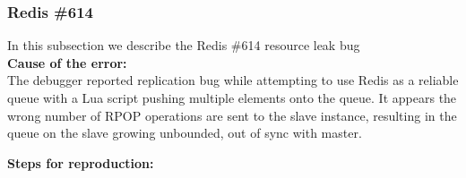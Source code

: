 \subsubsection{Redis \#614}

In this subsection we describe the Redis \#614 resource leak bug \\

\noindent \textbf{Cause of the error:} \\

The debugger reported replication bug while attempting to use Redis as a reliable queue with a Lua script pushing multiple elements onto the queue. 
It appears the wrong number of RPOP operations are sent to the slave instance, resulting in the queue on the slave growing unbounded, out of sync with master.

\noindent \textbf{Steps for reproduction:} \\

